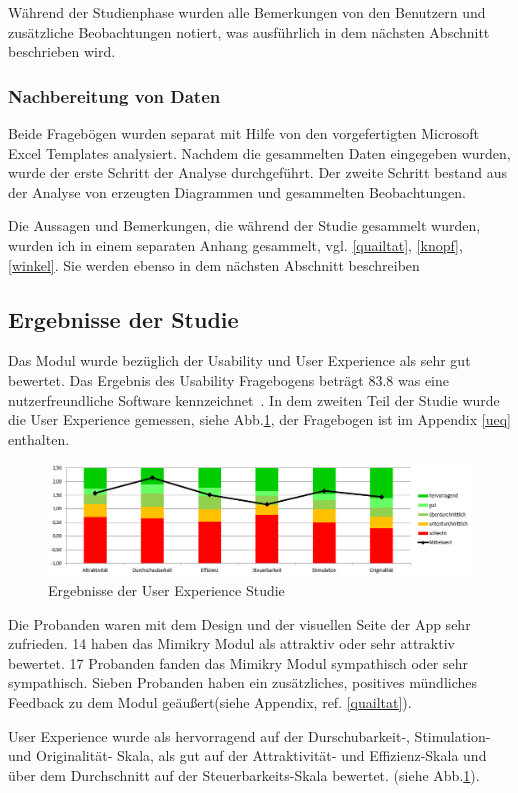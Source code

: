 Während der Studienphase wurden alle Bemerkungen von den Benutzern und zusätzliche Beobachtungen notiert, was ausführlich in dem nächsten Abschnitt beschrieben wird.

\subsubsection{Nachbereitung von Daten}
Beide Fragebögen wurden separat mit Hilfe von den vorgefertigten Microsoft Excel Templates analysiert. Nachdem die gesammelten Daten eingegeben wurden, wurde der erste Schritt der Analyse durchgeführt. Der zweite Schritt bestand aus der Analyse von erzeugten Diagrammen und gesammelten Beobachtungen.

Die Aussagen und Bemerkungen, die während der Studie gesammelt wurden, wurden ich in einem separaten Anhang gesammelt, vgl. \ref{quailtat}, \ref{knopf}, \ref{winkel}. Sie werden ebenso in dem nächsten Abschnitt beschreiben
\subsection{Ergebnisse der Studie} 
Das Modul wurde bezüglich der Usability und User Experience als sehr gut bewertet. 
Das Ergebnis des Usability Fragebogens beträgt 83.8 was eine nutzerfreundliche Software kennzeichnet~\cite{Usability}.
In dem zweiten Teil der Studie wurde die User Experience gemessen, siehe Abb.\ref{uxmimikry}, der Fragebogen ist im Appendix \ref{ueq} enthalten.
\begin{figure}[H]
\centering\includegraphics[width=330pt]{res/ux_final}
\caption{Ergebnisse der User Experience Studie}
\label{uxmimikry}
\end{figure}

Die Probanden waren mit dem Design und der visuellen Seite der App sehr zufrieden. 14 haben das Mimikry Modul als attraktiv oder sehr attraktiv bewertet.
17 Probanden fanden das Mimikry Modul sympathisch oder sehr sympathisch. Sieben Probanden haben ein zusätzliches, positives mündliches Feedback zu dem Modul geäußert(siehe Appendix, ref. \ref{quailtat}).

User Experience wurde als hervorragend auf der Durschubarkeit-, Stimulation- und Originalität- Skala, als gut auf der Attraktivität- und Effizienz-Skala und über dem Durchschnitt auf der Steuerbarkeits-Skala bewertet. (siehe Abb.\ref{uxmimikry}). 

